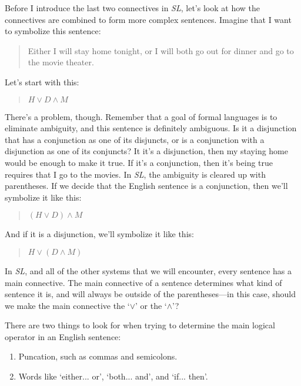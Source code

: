 \documentclass[../logic-text.tex]{subfiles}
\begin{document}
Before I introduce the last two connectives in \emph{SL}, let's look at how the connectives are combined to form more complex sentences. Imagine that I want to symbolize this sentence:

\begin{quote}
  Either I will stay home tonight, or I will both go out for dinner and go to the movie theater.
\end{quote}

Let's start with this:

\begin{quote}
  \(H \lor D \land M\)
\end{quote}

There's a problem, though. Remember that a goal of formal languages is to eliminate ambiguity, and this sentence is definitely ambiguous. Is it a disjunction that has a conjunction as one of its disjuncts, or is a conjunction with a disjunction as one of its conjuncts? It it's a disjunction, then my staying home would be enough to make it true. If it's a conjunction, then it's being true requires that I go to the movies. In \emph{SL}, the ambiguity is cleared up with parentheses. If we decide that the English sentence is a conjunction, then we'll symbolize it like this:

\begin{quote}
  \((H \lor D) \land M\)
\end{quote}

\noindent And if it is a disjunction, we'll symbolize it like this:

\begin{quote}
    \(H \lor (D \land M)\)
\end{quote}

In \emph{SL}, and all of the other systems that we will encounter, every sentence has a main connective. The main connective of a sentence determines what kind of sentence it is, and will always be outside of the parentheses---in this case, should we make the main connective the \enquote*{\(\lor\)} or the \enquote*{\(\land\)}?

There are two things to look for when trying to determine the main logical operator in an English sentence:

\begin{enumerate}
  \item Puncation, such as commas and semicolons.
  \item Words like \enquote*{either... or}, \enquote*{both... and}, and \enquote*{if... then}.
\end{enumerate}
\end{document}

